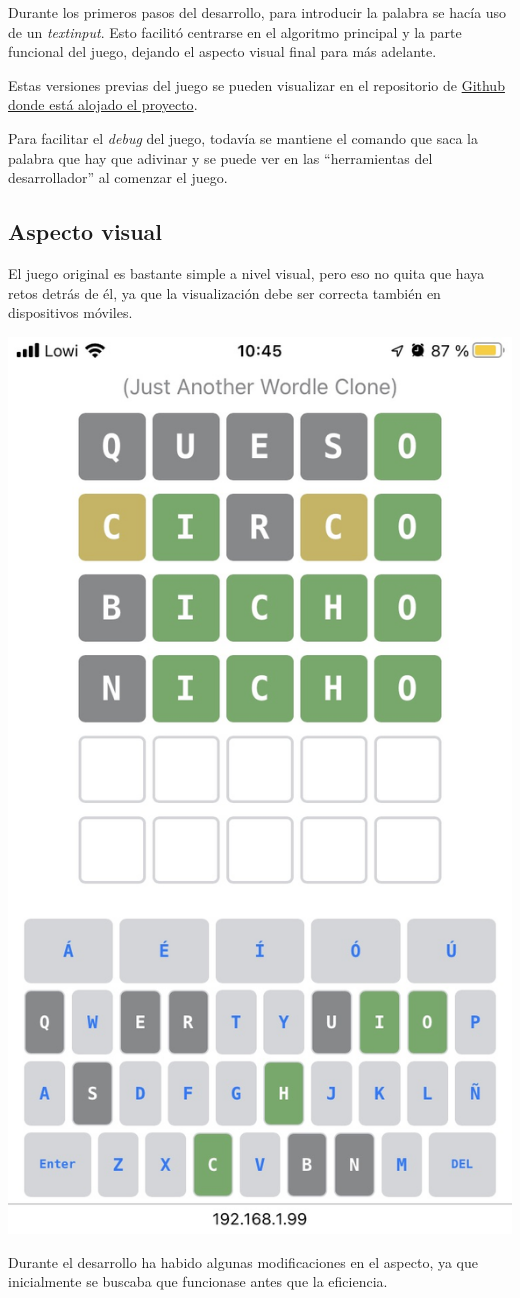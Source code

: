 \documentclass{\ClassPath/viu-tfm-template}
\begin{document}
Durante los primeros pasos del desarrollo, para introducir la palabra se hacía uso de un \textit{textinput}. Esto facilitó centrarse en el algoritmo principal y la parte funcional del juego, dejando el aspecto visual final para más adelante.

Estas versiones previas del juego se pueden visualizar en el repositorio de \href{https://github.com/yuki/jawc}{Github donde está alojado el proyecto}.

Para facilitar el \textit{debug} del juego, todavía se mantiene el comando que saca la palabra que hay que adivinar  y se puede ver en las “herramientas del desarrollador” al comenzar el juego.

\subsection{Aspecto visual}
El juego original es bastante simple a nivel visual, pero eso no quita que haya retos detrás de él, ya que la visualización debe ser correcta también en dispositivos móviles.

\vspace{-1em}
\begin{center}
    \includegraphics[frame,width=0.48\linewidth]{img/movil.png}
\end{center}
\vspace{-1em}

Durante el desarrollo ha habido algunas modificaciones en el aspecto, ya que inicialmente se buscaba que funcionase antes que la eficiencia.
\end{document}
